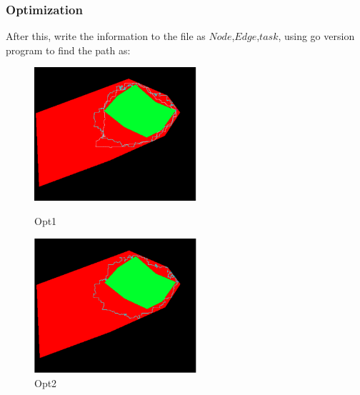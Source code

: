\documentclass[letterpaper,12pt]{article}
\begin{document}
\subsubsection{Optimization}
After this, write the information to the file as $Node$,$Edge$,$task$, using go version program to find the path as:
\begin{figure}[htbp]
	\centering
	\begin{minipage}[t]{0.48\textwidth}
		\centering
		\includegraphics[width=6cm]{Image/5-2.png}
		\caption{Opt1}
	\end{minipage}
	\begin{minipage}[t]{0.48\textwidth}
		\centering
		\includegraphics[width=6cm]{Image/5-1.png}
		\caption{Opt2}
	\end{minipage}
\end{figure}
\end{document}
